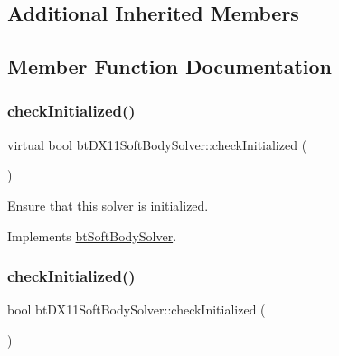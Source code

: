 \subsection*{Additional Inherited Members}


\subsection{Member Function Documentation}
\mbox{\label{classbtDX11SoftBodySolver_aeb15cea9089da79d1eb40f3786ec86a0}} 
\subsubsection{\texorpdfstring{check\+Initialized()}{checkInitialized()}\hspace{0.1cm}{\footnotesize\ttfamily [1/2]}}
{\footnotesize\ttfamily virtual bool bt\+D\+X11\+Soft\+Body\+Solver\+::check\+Initialized (\begin{DoxyParamCaption}{ }\end{DoxyParamCaption})\hspace{0.3cm}{\ttfamily [virtual]}}

Ensure that this solver is initialized. 

Implements \hyperlink{classbtSoftBodySolver_aae0adf7ffc11cd7fafec927a54c654d5}{bt\+Soft\+Body\+Solver}.

\mbox{\label{classbtDX11SoftBodySolver_a22b92962365db3adc0086eaac84dde9f}} 
\subsubsection{\texorpdfstring{check\+Initialized()}{checkInitialized()}\hspace{0.1cm}{\footnotesize\ttfamily [2/2]}}
{\footnotesize\ttfamily bool bt\+D\+X11\+Soft\+Body\+Solver\+::check\+Initialized (\begin{DoxyParamCaption}{ }\end{DoxyParamCaption})\hspace{0.3cm}{\ttfamily [virtual]}}

